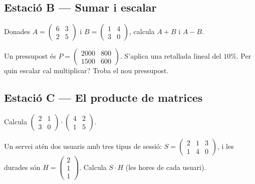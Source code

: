 \subsection{Estació B — Sumar i escalar}

\begin{exercicis}[Estació B]
\begin{exlist}
  \item Donades $A=\begin{pmatrix} 6 & 3 \\ 2 & 5 \end{pmatrix}$ i
        $B=\begin{pmatrix} 1 & 4 \\ 3 & 0 \end{pmatrix}$, calcula $A+B$ i $A-B$.
  \item Un pressupost és $P=\begin{pmatrix} 2000 & 800 \\ 1500 & 600 \end{pmatrix}$.
        S'aplica una retallada lineal del $10\%$. Per quin escalar cal multiplicar?
        Troba el nou pressupost.
\end{exlist}
\end{exercicis}

\subsection{Estació C — El producte de matrices}

\begin{exercicis}[Estació C]
\begin{exlist}
  \item Calcula $\begin{pmatrix} 2 & 1 \\ 3 & 0 \end{pmatrix}\cdot\begin{pmatrix} 4 & 2 \\ 1 & 5 \end{pmatrix}$.
  \item Un servei atén dos usuaris amb tres tipus de sessió:
        $S=\begin{pmatrix} 2 & 1 & 3 \\ 1 & 4 & 0 \end{pmatrix}$, i les durades són
        $H=\begin{pmatrix} 2 \\ 1 \\ 1 \end{pmatrix}$. Calcula $S\cdot H$ (les hores
        de cada usuari).
\end{exlist}
\end{exercicis}

